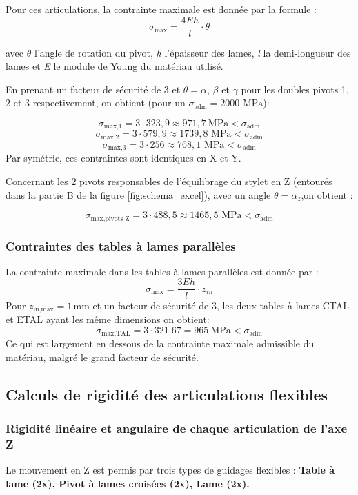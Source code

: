 \documentclass[a4paper, 11pt]{article} %
\begin{document}
Pour ces articulations, la contrainte maximale est donnée par la formule :
\[
\sigma_\text{max} = \frac{4Eh}{l} \cdot \theta
\]

avec $\theta$ l'angle de rotation du pivot, \textit{h} l'épaisseur des lames, \textit{l} la demi-longueur des lames et \textit{E} le module de Young du matériau utilisé.

En prenant un facteur de sécurité de $3$ et $\theta = \alpha$, $\beta$ et $\gamma$ pour les doubles pivots 1, 2 et 3 respectivement, on obtient (pour un $\sigma_\text{adm} = 2000 \text{ MPa}$):

\[
\sigma_{\text{max,1}} = 3\cdot323,9 \approx 971,7
\ \text{MPa} < \sigma_{\text{adm}}
\]
\[
\sigma_{\text{max,2}} = 3\cdot579,9 \approx 1739,8
 \text{ MPa} < \sigma_{\text{adm}}
\]
\[
\sigma_{\text{max,3}} = 3\cdot256 \approx 768,1
 \text{ MPa} < \sigma_{\text{adm}}
\]
Par symétrie, ces contraintes sont identiques en X et Y.

Concernant les 2 pivots responsables de l’équilibrage du stylet en Z (entourés dans la partie B de la figure \ref{fig:schema_excel}), avec un angle $\theta = \alpha_z$,on obtient :   

$$
\sigma_{\text{max,pivots Z}} = 3\cdot488,5 \approx 1465,5\text{ MPa} < \sigma_{\text{adm}}
$$

\subsubsection*{Contraintes des tables à lames parallèles}
La contrainte maximale dans les tables à lames parallèles est donnée par : 
\[
\sigma_\text{max} = \frac{3Eh}{l} \cdot z_{in}
\]
Pour \( z_{\text{in,max}} = 1\,\text{mm} \) et un facteur de sécurité de 3, les deux tables à lames CTAL et ETAL ayant les même dimensions on obtient: 
\[
\sigma_{\text{max,TAL}} = 3\cdot 321.67 = 965
\ \text{MPa} < \sigma_{\text{adm}}
\]
Ce qui est largement en dessous de la contrainte maximale admissible du matériau, malgré le grand facteur de sécurité.

\subsection{Calculs de rigidité des articulations flexibles}\label{rigidite}
\subsubsection*{Rigidité linéaire et angulaire de chaque articulation de l'axe Z}
Le mouvement en Z est permis par trois types de guidages flexibles : 
\textbf{Table à lame (2x), Pivot à lames croisées (2x), Lame (2x).}
\end{document}
